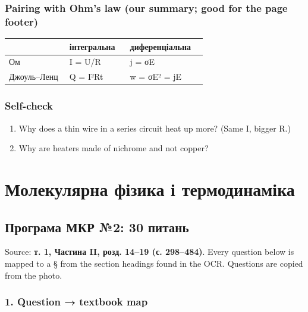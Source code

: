 \documentclass[11pt,a4paper,oneside]{book}
\begin{document}
\section*{Pairing with Ohm's law (our summary; good for the page footer)}
{\small
\begin{longtable}{>{\raggedright\arraybackslash}p{0.291\linewidth}>{\raggedright\arraybackslash}p{0.291\linewidth}>{\raggedright\arraybackslash}p{0.370\linewidth}}
\toprule
\textbf{} & \textbf{інтегральна} & \textbf{диференціальна} \\
\midrule
\endhead
Ом & I = U/R & j = σE \\
Джоуль–Ленц & Q = I²Rt & w = σE² = jE \\
\bottomrule
\end{longtable}
}

\section*{Self-check}
\begin{enumerate}
\item Why does a thin wire in a series circuit heat up more? (Same I, bigger R.)
\item Why are heaters made of nichrome and not copper?
\end{enumerate}

\part{Молекулярна фізика і термодинаміка}

\chapter*{Програма МКР №2: 30 питань}



Source: \textbf{т. 1, Частина II, розд. 14–19 (с. 298–484)}. Every question below is mapped to a § from the section headings found in the OCR. Questions are copied from the photo.

\section*{1. Question → textbook map}
\end{document}
